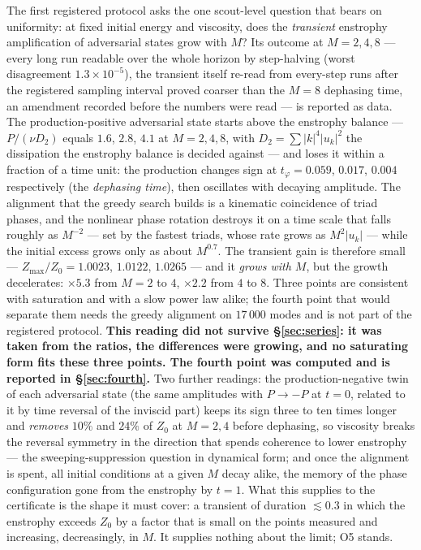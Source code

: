 \documentclass[11pt,a4paper]{article}
\theoremstyle{definition}
\theoremstyle{plain}
\begin{document}
The first registered protocol asks the one scout-level question that bears on uniformity:
at fixed initial energy and viscosity, does the \emph{transient} enstrophy amplification of
adversarial states grow with $M$? Its outcome at $M=2,4,8$ --- every long run readable over
the whole horizon by step-halving (worst disagreement $1.3\times10^{-5}$), the transient
itself re-read from every-step runs after the registered sampling interval proved coarser than
the $M=8$ dephasing time, an amendment recorded before the numbers were read --- is reported
as data. The production-positive adversarial state starts above the enstrophy balance ---
$P/(\nu D_2)$ equals $1.6$, $2.8$, $4.1$ at $M=2,4,8$, with $D_2=\sum|k|^4|u_k|^2$ the
dissipation the enstrophy balance is decided against --- and loses it within a fraction of a
time unit: the production changes sign at $t_\varphi = 0.059$, $0.017$, $0.004$ respectively
(the \emph{dephasing time}), then
oscillates with decaying amplitude. The alignment that the greedy search builds is a kinematic
coincidence of triad phases, and the nonlinear phase rotation destroys it on a time scale that
falls roughly as $M^{-2}$ --- set by the fastest triads, whose rate grows as $M^2|u_k|$ ---
while the initial excess grows only as about $M^{0.7}$. The transient gain is therefore small
--- $Z_{\max}/Z_0=1.0023$, $1.0122$, $1.0265$ --- and it \emph{grows with $M$}, but the
growth decelerates: $\times5.3$ from $M=2$ to $4$, $\times2.2$ from $4$ to $8$. Three points
are consistent with saturation and with a slow power law alike; the fourth point that would
separate them needs the greedy alignment on $17\,000$ modes and is not part of the registered
protocol. \textbf{This reading did not survive \S\ref{sec:series}: it was taken from the
ratios, the differences were growing, and no saturating form fits these three points. The
fourth point was computed and is reported in \S\ref{sec:fourth}.} Two further readings: the production-negative twin of each adversarial state (the
same amplitudes with $P\to-P$ at $t=0$, related to it by time reversal of the inviscid part)
keeps its sign three to ten times longer and \emph{removes} $10\%$ and $24\%$ of $Z_0$ at
$M=2,4$ before dephasing, so viscosity breaks the reversal symmetry in the direction that
spends coherence to lower enstrophy --- the sweeping-suppression question in dynamical form;
and once the alignment is spent, all initial conditions at a given $M$ decay alike, the memory
of the phase configuration gone from the enstrophy by $t=1$. What this supplies to the
certificate is the shape it must cover: a transient of duration $\lesssim 0.3$ in which the
enstrophy exceeds $Z_0$ by a factor that is small on the points measured and increasing,
decreasingly, in $M$. It supplies nothing about the limit; O5 stands.
\end{document}
